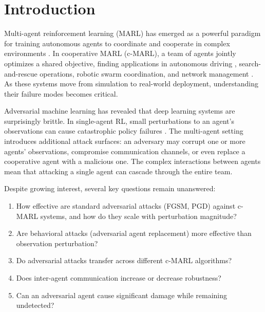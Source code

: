 \documentclass[12pt,a4paper]{article}
\begin{document}
\newpage
\tableofcontents
\newpage

\section{Introduction}
\label{sec:intro}

Multi-agent reinforcement learning (MARL) has emerged as a powerful paradigm for training autonomous agents to coordinate and cooperate in complex environments \citep{busoniu2008comprehensive}. In cooperative MARL (c-MARL), a team of agents jointly optimizes a shared objective, finding applications in autonomous driving \citep{wang2025robust}, search-and-rescue operations, robotic swarm coordination, and network management \citep{kazari2023decentralized}. As these systems move from simulation to real-world deployment, understanding their failure modes becomes critical.

Adversarial machine learning has revealed that deep learning systems are surprisingly brittle. In single-agent RL, small perturbations to an agent's observations can cause catastrophic policy failures \citep{huang2017adversarial}. The multi-agent setting introduces additional attack surfaces: an adversary may corrupt one or more agents' observations, compromise communication channels, or even replace a cooperative agent with a malicious one. The complex interactions between agents mean that attacking a single agent can cascade through the entire team.

Despite growing interest, several key questions remain unanswered:

\begin{enumerate}[label=(\roman*)]
    \item How effective are standard adversarial attacks (FGSM, PGD) against c-MARL systems, and how do they scale with perturbation magnitude?
    \item Are behavioral attacks (adversarial agent replacement) more effective than observation perturbation?
    \item Do adversarial attacks transfer across different c-MARL algorithms?
    \item Does inter-agent communication increase or decrease robustness?
    \item Can an adversarial agent cause significant damage while remaining undetected?
\end{enumerate}
\end{document}
